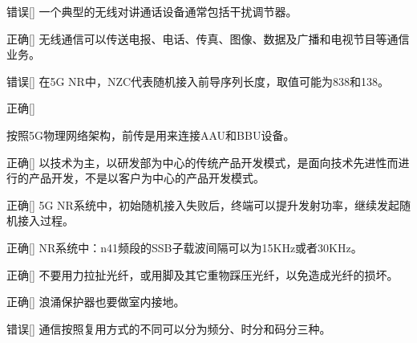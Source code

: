 \begin{choice}{\;错误\;}[]
    一个典型的无线对讲通话设备通常包括干扰调节器。

\end{choice}


\begin{choice}{\;正确\;}[]
    无线通信可以传送电报、电话、传真、图像、数据及广播和电视节目等通信业务。

\end{choice}

\begin{choice}{\;错误\;}[]
    在5G NR中，NZC代表随机接入前导序列长度，取值可能为838和138。

\end{choice}

\begin{choice}{\;正确\;}[]

    按照5G物理网络架构，前传是用来连接AAU和BBU设备。
\end{choice}


\begin{choice}{\;正确\;}[]
    以技术为主，以研发部为中心的传统产品开发模式，是面向技术先进性而进行的产品开发，不是以客户为中心的产品开发模式。

\end{choice}

\begin{choice}{\;正确\;}[]
    5G NR系统中，初始随机接入失败后，终端可以提升发射功率，继续发起随机接入过程。

\end{choice}


\begin{choice}{\;正确\;}[]
    NR系统中：n41频段的SSB子载波间隔可以为15KHz或者30KHz。

\end{choice}


\begin{choice}{\;正确\;}[]
    不要用力拉扯光纤，或用脚及其它重物踩压光纤，以免造成光纤的损坏。

\end{choice}


\begin{choice}{\;正确\;}[]
    浪涌保护器也要做室内接地。

\end{choice}


\begin{choice}{\;错误\;}[]
    通信按照复用方式的不同可以分为频分、时分和码分三种。

\end{choice}


